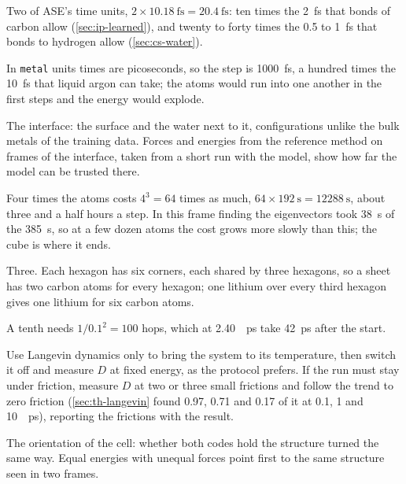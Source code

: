 \label{sec:ip-answers}

Two of ASE's time units, $2\times\SI{10.18}{\femto
\second} = \SI{20.4}{\femto\second}$: ten times the \SI{2}{\femto\second}
that bonds of carbon allow (\cref{sec:ip-learned}), and twenty to forty
times the 0.5 to \SI{1}{\femto\second} that bonds to hydrogen allow
(\cref{sec:cs-water}).

In \texttt{metal} units times are picoseconds, so
the step is \SI{1000}{\femto\second}, a hundred times the
\SI{10}{\femto\second} that liquid argon can take; the atoms would run
into one another in the first steps and the energy would explode.

The interface: the surface and the water next to
it, configurations unlike the bulk metals of the training data. Forces
and energies from the reference method on frames of the interface, taken
from a short run with the model, show how far the model can be trusted
there.

Four times the atoms costs $4^3 = 64$ times as much,
$64\times\SI{192}{\second} = \SI{12288}{\second}$, about three and a half
hours a step. In this frame finding the eigenvectors took
\SI{38}{\second} of the \SI{385}{\second}, so at a few dozen atoms the cost
grows more slowly than this; the cube is where it ends.

Three. Each hexagon has six corners, each shared by
three hexagons, so a sheet has two carbon atoms for every hexagon; one
lithium over every third hexagon gives one lithium for six carbon atoms.

A tenth needs $1/0.1^2 = 100$ hops, which at
\SI{2.40}{\per\pico\second} take \SI{42}{\pico\second} after the start.

Use Langevin dynamics only to bring the system
to its temperature, then switch it off and measure $D$ at fixed energy,
as the protocol prefers. If the run must stay under friction, measure $D$
at two or three small frictions and follow the trend to zero friction
(\cref{sec:th-langevin} found 0.97, 0.71 and 0.17 of it at 0.1, 1 and
\SI{10}{\per\pico\second}), reporting the frictions with the result.

The orientation of the cell: whether both
codes hold the structure turned the same way. Equal energies with unequal
forces point first to the same structure seen in two frames.
